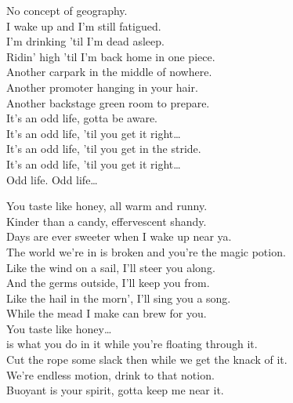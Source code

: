 
No concept of geography. \\
I wake up and I'm still fatigued. \\
I'm drinking 'til I'm dead asleep. \\
Ridin' high 'til I'm back home in one piece. \\
Another carpark in the middle of nowhere. \\
Another promoter hanging in your hair. \\
Another backstage green room to prepare. \\
It's an odd life, gotta be aware. \\

It's an odd life, 'til you get it right… \\
It's an odd life, 'til you get in the stride. \\

It's an odd life, 'til you get it right… \\

Odd life. Odd life… \\





You taste like honey, all warm and runny. \\
Kinder than a candy, effervescent shandy. \\
Days are ever sweeter when I wake up near ya. \\
The world we're in is broken and you're the magic potion. \\

Like the wind on a sail, I'll steer you along. \\
And the germs outside, I'll keep you from. \\
Like the hail in the morn', I'll sing you a song. \\
While the mead I make can brew for you. \\

You taste like honey… \\

 is what you do in it while you're floating through it. \\
Cut the rope some slack then while we get the knack of it. \\
We're endless motion, drink to that notion. \\
Buoyant is your spirit, gotta keep me near it. \\

